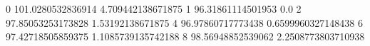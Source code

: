 0 101.0280532836914 4.709442138671875
1 96.31861114501953 0.0
2 97.85053253173828 1.53192138671875
4 96.97860717773438 0.6599960327148438
6 97.42718505859375 1.1085739135742188
8 98.56948852539062 2.2508773803710938

